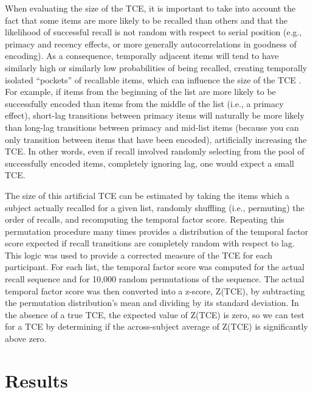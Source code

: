 \documentclass[man,natbib,floatsintext]{apa6} %
\begin{document}
When evaluating the size of the TCE, it is important to take into account the fact that some items are more likely to be recalled than others and that the likelihood of successful recall is not random with respect to serial position (e.g., primacy and recency effects, or more generally autocorrelations in goodness of encoding). As a consequence, temporally adjacent items will tend to have similarly high or similarly low probabilities of being recalled, creating temporally isolated ``pockets'' of recallable items, which can influence the size of the TCE \citep{Hint16,SedeEtal10}. For example, if items from the beginning of the list are more likely to be successfully encoded than items from the middle of the list (i.e., a primacy effect), short-lag transitions between primacy items will naturally be more likely than long-lag transitions between primacy and mid-list items (because you can only transition between items that have been encoded), artificially increasing the TCE. In other words, even if recall involved randomly selecting from the pool of successfully encoded items, completely ignoring lag, one would expect a small TCE.

The size of this artificial TCE can be estimated by taking the items which a subject actually recalled for a given list, randomly shuffling (i.e., permuting) the order of recalls, and recomputing the temporal factor score. Repeating this permutation procedure many times provides a distribution of the temporal factor score expected if recall transitions are completely random with respect to lag. This logic was used to provide a corrected measure of the TCE for each participant. For each list, the temporal factor score was computed for the actual recall sequence and for 10,000 random permutations of the sequence.
The actual temporal factor score was then converted into a z-score, Z(TCE), by subtracting the permutation distribution's mean and dividing by its standard deviation. In the absence of a true TCE, the expected value of Z(TCE) is zero, so we can test for a TCE by determining if the across-subject average of Z(TCE) is significantly above zero.

\section{Results}
\end{document}
